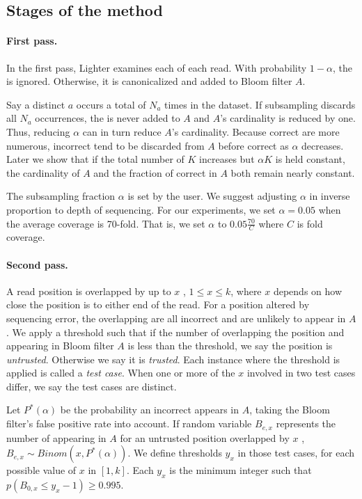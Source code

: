 \documentclass[10pt]{article}
\begin{document}
\subsection*{Stages of the method}
\paragraph{First pass.}    In the first pass, Lighter examines each \kmer of each read.  With probability $1 - \alpha$, the \kmer is ignored.  Otherwise, it is canonicalized and added to Bloom filter $A$.

Say a distinct \kmer $a$ occurs a total of $N_a$ times in the dataset.  If subsampling discards all $N_a$ occurrences, the \kmer is never added to $A$ and $A$'s cardinality is reduced by one.  Thus, reducing $\alpha$ can in turn reduce $A$'s cardinality.  Because correct \kmers are more numerous, incorrect \kmers tend to be discarded from $A$ before correct \kmers as $\alpha$ decreases.  Later we show that if the total number of \kmers $K$ increases but $\alpha K$ is held constant, the cardinality of $A$ and the fraction of correct \kmers in $A$ both remain nearly constant.

The subsampling fraction $\alpha$ is set by the user.  We suggest adjusting $\alpha$ in inverse proportion to depth of sequencing.  For our experiments, we set $\alpha=0.05$ when the average coverage is 70-fold.  That is, we set $\alpha$ to $0.05\frac{70}{C}$ where $C$ is fold coverage.

\paragraph{Second pass.} 
A read position is overlapped by up to $x$ \kmers, $1\le x\le k$, where $x$ depends on how close the position is to either end of the read.
For a position altered by sequencing error, the overlapping \kmers are all incorrect and are unlikely to appear in $A$.
We apply a threshold such that if the number of \kmers overlapping the position and appearing in Bloom filter $A$ is less than the threshold, we say the position is \emph{untrusted}.
Otherwise we say it is \emph{trusted}.
Each instance where the threshold is applied is called a \emph{test case}.
When one or more of the $x$ \kmers involved in two test cases differ, we say the test cases are distinct.

Let $P^*(\alpha)$ be the probability an incorrect \kmer appears in $A$, taking the Bloom filter's false positive rate into account.  If random variable $B_{e,x}$ represents the number of \kmers appearing in $A$ for an untrusted position overlapped by $x$ \kmers, $B_{e,x} \sim Binom(x,P^*(\alpha))$.  We define thresholds $y_x$ in those test cases, for each possible value of $x$ in $[1, k]$.  Each $y_x$ is the minimum integer such that $p(B_{0,x}\le y_x - 1)\ge 0.995$.
\end{document}
